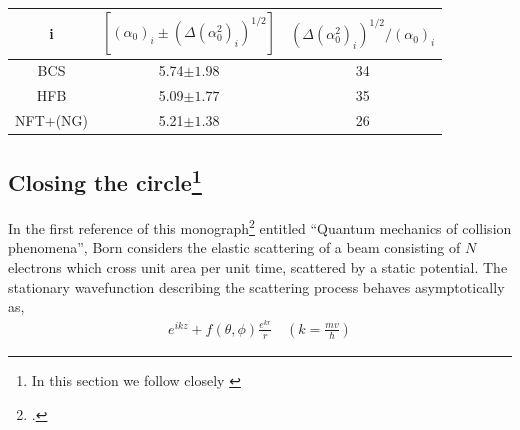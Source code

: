 \begin{table}
\begin{center}
\begin{tabular}{|c|c|c|}
\hline
i&$\left[(\alpha_0)_i\pm(\Delta(\alpha_0^2)_i)^{1/2}\right]$ & $(\Delta(\alpha_0^2)_i)^{1/2}/(\alpha_0)_i$\\
\hline
BCS&5.74$\pm 1.98$& 34\\
\hline
HFB&5.09$\pm 1.77$ &35\\
\hline
NFT+(NG)&5.21$\pm 1.38$& 26\\
\hline
\end{tabular}
\end{center}
\caption{}\label{tab6.6.4}
\end{table} 
\subsection[Closing the circle]{Closing the circle\footnote{In this section we follow closely \cite{Pais:86}}}
In the first reference of this monograph\footnote{\cite{Born:26}.} entitled ``Quantum mechanics of collision phenomena'', Born considers the elastic scattering of a beam consisting of $N$ electrons which cross unit area per unit time, scattered by a static potential. The stationary wavefunction describing the scattering process behaves asymptotically as,
\begin{align}
e^{ikz}+f(\theta,\phi)\frac{e^{kr}}{r}\quad \left(k=\frac{mv}{\hbar}\right)
\end{align}
